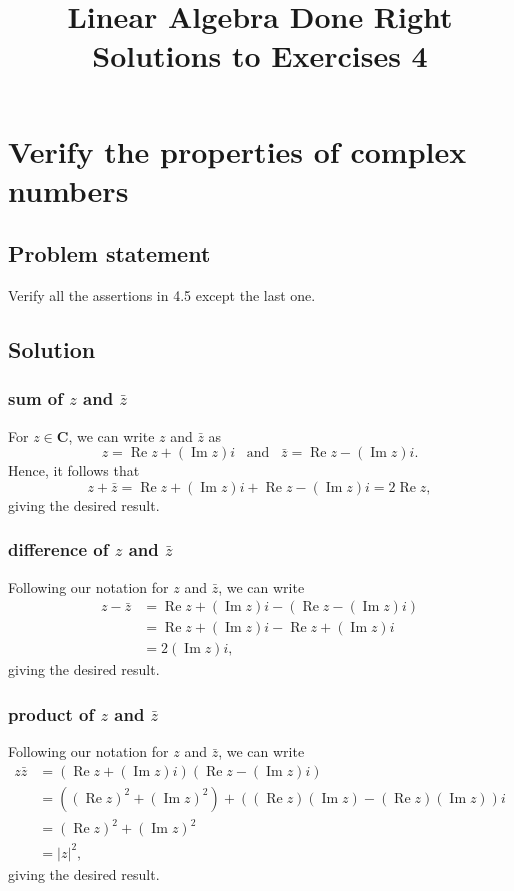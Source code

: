 \documentclass{article}
\title{Linear Algebra Done Right\\Solutions to Exercises 4}
\author{}
\date{}
\begin{document}
\maketitle

\section{Verify the properties of complex numbers}
\subsection*{Problem statement}
Verify all the assertions in 4.5 except the last one.

\subsection*{Solution}
\subsubsection*{sum of $z$ and $\bar{z}$}
For $z\in\mathbf{C}$, we can write $z$ and $\bar{z}$ as
\[z=\operatorname{Re}z+(\operatorname{Im}z)i\;\;\;\text{and}\;\;\;\bar{z}=\operatorname{Re}z-(\operatorname{Im}z)i.\]
Hence, it follows that
\[z+\bar{z}=\operatorname{Re}z+(\operatorname{Im}z)i+\operatorname{Re}z-(\operatorname{Im}z)i=2\operatorname{Re}z,\]
giving the desired result.

\subsubsection*{difference of $z$ and $\bar{z}$}
Following our notation for $z$ and $\bar{z}$, we can write
\begin{align*}
    z-\bar{z}&=\operatorname{Re}z+(\operatorname{Im}z)i-(\operatorname{Re}z-(\operatorname{Im}z)i)\\
    &=\operatorname{Re}z+(\operatorname{Im}z)i-\operatorname{Re}z+(\operatorname{Im}z)i\\
    &=2(\operatorname{Im}z)i,
\end{align*}
giving the desired result.

\subsubsection*{product of $z$ and $\bar{z}$}
Following our notation for $z$ and $\bar{z}$, we can write
\begin{align*}
    z\bar{z}&=(\operatorname{Re}z+(\operatorname{Im}z)i)(\operatorname{Re}z-(\operatorname{Im}z)i)\\
    &=((\operatorname{Re}z)^2+(\operatorname{Im}z)^2)+((\operatorname{Re}z)(\operatorname{Im}z)-(\operatorname{Re}z)(\operatorname{Im}z))i\\
    &=(\operatorname{Re}z)^2+(\operatorname{Im}z)^2\\
    &=|z|^2,
\end{align*}
giving the desired result.
\end{document}
